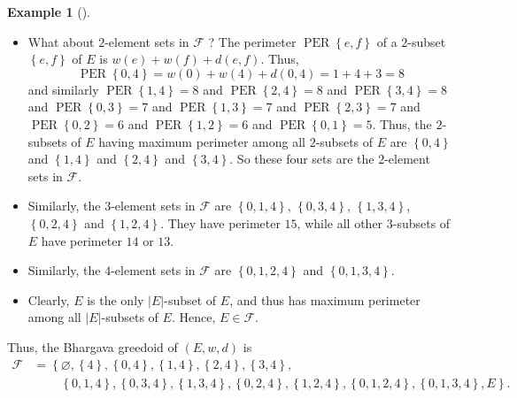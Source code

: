\documentclass[numbers=enddot,12pt,final,onecolumn,notitlepage]{scrartcl}%
\theoremstyle{definition}
\newtheorem{exam}[theo]{Example}
\newenvironment{example}[1][]
{\begin{exam}[#1]\begin{leftbar}}
{\end{leftbar}\end{exam}}
\theoremstyle{plainsl}
\begin{document}
\begin{example}
\begin{itemize}
\item What about $2$-element sets in $\mathcal{F}$ ? The perimeter
$\operatorname*{PER}\left\{  e,f\right\}  $ of a $2$-subset $\left\{
e,f\right\}  $ of $E$ is $w\left(  e\right)  +w\left(  f\right)  +d\left(
e,f\right)  $. Thus,%
\[
\operatorname*{PER}\left\{  0,4\right\}  =w\left(  0\right)  +w\left(
4\right)  +d\left(  0,4\right)  =1+4+3=8
\]
and similarly $\operatorname*{PER}\left\{  1,4\right\}  =8$ and
$\operatorname*{PER}\left\{  2,4\right\}  =8$ and $\operatorname*{PER}\left\{
3,4\right\}  =8$ and $\operatorname*{PER}\left\{  0,3\right\}  =7$ and
$\operatorname*{PER}\left\{  1,3\right\}  =7$ and $\operatorname*{PER}\left\{
2,3\right\}  =7$ and $\operatorname*{PER}\left\{  0,2\right\}  =6$ and
$\operatorname*{PER}\left\{  1,2\right\}  =6$ and $\operatorname*{PER}\left\{
0,1\right\}  =5$. Thus, the $2$-subsets of $E$ having maximum perimeter among
all $2$-subsets of $E$ are $\left\{  0,4\right\}  $ and $\left\{  1,4\right\}
$ and $\left\{  2,4\right\}  $ and $\left\{  3,4\right\}  $. So these four
sets are the $2$-element sets in $\mathcal{F}$.

\item Similarly, the $3$-element sets in $\mathcal{F}$ are $\left\{
0,1,4\right\}  $, $\left\{  0,3,4\right\}  $, $\left\{  1,3,4\right\}  $,
$\left\{  0,2,4\right\}  $ and $\left\{  1,2,4\right\}  $. They have perimeter
$15$, while all other $3$-subsets of $E$ have perimeter $14$ or $13$.

\item Similarly, the $4$-element sets in $\mathcal{F}$ are $\left\{
0,1,2,4\right\}  $ and $\left\{  0,1,3,4\right\}  $.

\item Clearly, $E$ is the only $\left\vert E\right\vert $-subset of $E$, and
thus has maximum perimeter among all $\left\vert E\right\vert $-subsets of
$E$. Hence, $E\in\mathcal{F}$.
\end{itemize}

Thus, the Bhargava greedoid of $\left(  E,w,d\right)  $ is%
\begin{align*}
\mathcal{F}  &  =\left\{  \varnothing,\left\{  4\right\}  ,\left\{
0,4\right\}  ,\left\{  1,4\right\}  ,\left\{  2,4\right\}  ,\left\{
3,4\right\}  ,\right. \\
&  \ \ \ \ \ \ \ \ \ \ \left.  \left\{  0,1,4\right\}  ,\left\{
0,3,4\right\}  ,\left\{  1,3,4\right\}  ,\left\{  0,2,4\right\}  ,\left\{
1,2,4\right\}  ,\left\{  0,1,2,4\right\}  ,\left\{  0,1,3,4\right\}
,E\right\}  .
\end{align*}

\end{example}
\end{document}
